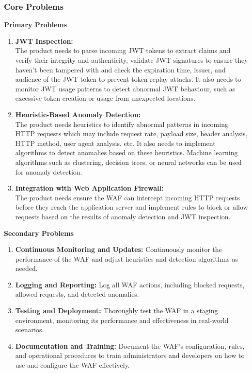 \subsubsection{Core Problems}
\textbf{Primary Problems}
\begin{enumerate}
    \item \textbf{JWT Inspection:}\\
        The product needs to parse incoming JWT tokens to extract claims and verify their integrity and authenticity, validate JWT signatures to ensure they haven't been tampered with and check the expiration time, issuer, and audience of the JWT token to prevent token replay attacks. It also needs to monitor JWT usage patterns to detect abnormal JWT behaviour, such as excessive token creation or usage from unexpected locations.
    
    \item \textbf{Heuristic-Based Anomaly Detection:}\\
        The product needs heuristics to identify abnormal patterns in incoming HTTP requests which may include request rate, payload size, header analysis, HTTP method, user agent analysis, etc. It also needs to implement algorithms to detect anomalies based on these heuristics. Machine learning algorithms such as clustering, decision trees, or neural networks can be used for anomaly detection.

    \item \textbf{Integration with Web Application Firewall:}\\
        The product needs ensure the WAF can intercept incoming HTTP requests before they reach the application server and implement rules to block or allow requests based on the results of anomaly detection and JWT inspection.
\end{enumerate}

\textbf{Secondary Problems}
\begin{enumerate}
    \item \textbf{Continuous Monitoring and Updates:}
        Continuously monitor the performance of the WAF and adjust heuristics and detection algorithms as needed.

    \item \textbf{Logging and Reporting:}
        Log all WAF actions, including blocked requests, allowed requests, and detected anomalies.

    \item \textbf{Testing and Deployment:}
        Thoroughly test the WAF in a staging environment, monitoring its performance and effectiveness in real-world scenarios.

    \item \textbf{Documentation and Training:}
        Document the WAF's configuration, rules, and operational procedures to train administrators and developers on how to use and configure the WAF effectively.

\end{enumerate}

